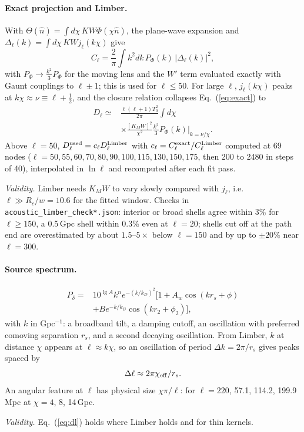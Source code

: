 \documentclass[10pt,twocolumn]{article}
\newcommand{\why}[1]{\par\noindent\textit{Validity.} #1\par}
\begin{document}
\paragraph{Exact projection and Limber.} With $\Theta(\hat n)=\int d\chi\,K W\Phi(\chi\hat n)$, the plane-wave expansion and $\Delta_\ell(k)=\int d\chi\,KWj_\ell(k\chi)$ give
\begin{equation}\label{eq:exact}
C_\ell=\frac{2}{\pi}\int k^2dk\,P_\Phi(k)\,|\Delta_\ell(k)|^2 ,
\end{equation}
with $P_\Phi\to\frac{k^2}{3}P_\Phi$ for the moving lens and the $W'$ term evaluated exactly with Gaunt couplings to $\ell\pm1$; this is used for $\ell\le50$. For large $\ell$, $j_\ell(k\chi)$ peaks at $k\chi\approx\nu\equiv\ell+\tfrac12$, and the closure relation collapses Eq.~(\ref{eq:exact}) to
\begin{equation}\label{eq:limber}\begin{split}
D_\ell\simeq&\frac{\ell(\ell+1)T_0^2}{2\pi}\int d\chi\\
&\times\frac{[K_MW]^2}{\chi^2}\frac{k^2}{3}P_\Phi(k)\Big|_{k=\nu/\chi}.
\end{split}\end{equation}
Above $\ell=50$, $D^{\rm used}_\ell=c_\ell D^{\rm Limber}_\ell$ with $c_\ell=C^{\rm exact}_\ell/C^{\rm Limber}_\ell$ computed at 69 nodes ($\ell=50,55,60,70,80,90,100,115,130,150,175$, then 200 to 2480 in steps of 40), interpolated in $\ln\ell$ and recomputed after each fit pass.
\why{Limber needs $K_MW$ to vary slowly compared with $j_\ell$, i.e.\ $\ell\gg R_c/w=10.6$ for the fitted window. Checks in \texttt{acoustic\_limber\_check*.json}: interior or broad shells agree within 3\% for $\ell\ge150$, a 0.5\,Gpc shell within 0.3\% even at $\ell=20$; shells cut off at the path end are overestimated by about $1.5$--$5\times$ below $\ell=150$ and by up to $\pm20\%$ near $\ell=300$.}

\paragraph{Source spectrum.}
\begin{equation}\label{eq:Pd}\begin{split}
P_\delta=&10^{\lg A}k^{n}e^{-(k/k_D)^2}\big[1+A_w\cos(kr_s+\phi)\\
&+Be^{-k/k_B}\cos(kr_2+\phi_2)\big],
\end{split}\end{equation}
with $k$ in Gpc$^{-1}$: a broadband tilt, a damping cutoff, an oscillation with preferred comoving separation $r_s$, and a second decaying oscillation. From Limber, $k$ at distance $\chi$ appears at $\ell\approx k\chi$, so an oscillation of period $\Delta k=2\pi/r_s$ gives peaks spaced by
\begin{equation}\label{eq:dl}
\Delta\ell\approx2\pi\chi_{\rm eff}/r_s .
\end{equation}
An angular feature at $\ell$ has physical size $\chi\pi/\ell$: for $\ell=220$, 57.1, 114.2, 199.9\,Mpc at $\chi=4$, 8, 14\,Gpc.
\why{Eq.~(\ref{eq:dl}) holds where Limber holds and for thin kernels.}
\end{document}
